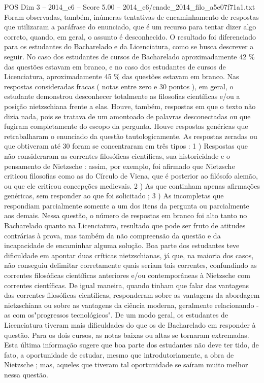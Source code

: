 \begin{textsample}{POS Dim 3 – 2014\_c6 – Score 5.00 – 2014\_c6/enade\_2014\_filo\_a5e07f71a1.txt}
Foram observadas, também, inúmeras tentativas de encaminhamento de respostas que utilizaram a paráfrase do enunciado, que é um recurso para tentar dizer algo correto, quando, em geral, o assunto é desconhecido.
O resultado foi diferenciado para os estudantes do Bacharelado e da Licenciatura, como se busca descrever a seguir.
No caso dos estudantes de cursos de Bacharelado aproximadamente 42 \% das questões estavam em branco, e no caso dos estudantes de cursos de Licenciatura, aproximadamente 45 \% das questões estavam em branco.
Nas respostas consideradas fracas ( notas entre zero e 30 pontos ), em geral, o estudante demonstrou desconhecer totalmente as filosofias científicas e/ou a posição nietzschiana frente a elas.
Houve, também, respostas em que o texto não dizia nada, pois se tratava de um amontoado de palavras desconectadas ou que fugiram completamente do escopo da pergunta.
Houve respostas genéricas que retrabalharam o enunciado da questão tautologicamente.
As respostas zeradas ou que obtiveram até 30 foram se concentraram em três tipos : 1 ) Respostas que não consideraram as correntes filosóficas científicas, sua historicidade e o pensamento de Nietzsche : assim, por exemplo, foi afirmado que Nietzsche criticou filosofias como as do Círculo de Viena, que é posterior ao filósofo alemão, ou que ele criticou concepções medievais. 2 ) As que continham apenas afirmações genéricas, sem responder ao que foi solicitado ; 3 ) As incompletas que respondiam parcialmente somente a um dos itens da pergunta ou parcialmente aos demais.
Nessa questão, o número de respostas em branco foi alto tanto no Bacharelado quanto na Licenciatura, resultado que pode ser fruto de atitudes contrárias à prova, mas também da não compreensão da questão e da incapacidade de encaminhar alguma solução.
Boa parte dos estudantes teve dificuldade em apontar duas críticas nietzschianas, já que, na maioria dos casos, não conseguiu delimitar corretamente quais seriam tais correntes, confundindo as correntes filosóficas científicas anteriores e/ou contemporâneas à Nietzsche com correntes científicas.
De igual maneira, quando tinham que falar das vantagens das correntes filosóficas científicas, responderam sobre as vantagens da abordagem nietzschiana ou sobre as vantagens da ciência moderna, geralmente relacionando -as com os"progressos tecnológicos".
De um modo geral, os estudantes de Licenciatura tiveram mais dificuldades do que os de Bacharelado em responder à questão.
Para os dois cursos, as notas baixas ou altas se tornaram extremadas.
Esta última informação sugere que boa parte dos estudantes não deve ter tido, de fato, a oportunidade de estudar, mesmo que introdutoriamente, a obra de Nietzsche ; mas, aqueles que tiveram tal oportunidade se saíram muito melhor nessa questão.

\end{textsample}
